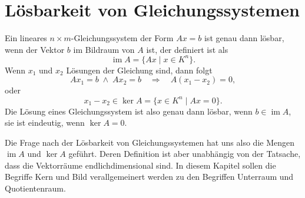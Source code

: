 %
%
%
\section{Lösbarkeit von Gleichungssystemen}
Ein lineares $n\times m$-Gleichungssystem der Form $Ax=b$
ist genau dann lösbar, wenn der Vektor $b$ im Bildraum von $A$ ist,
der definiert ist als
\[
\operatorname{im} A = \{ Ax\;|\; x\in K^n\}.
\]
Wenn $x_1$ und $x_2$ Lösungen der Gleichung sind, dann folgt
\[
Ax_1=b\;\wedge\; Ax_2=b
\quad\Rightarrow\quad
A(x_1-x_2)=0,
\]
oder
\[
x_1-x_2\in\operatorname{ker} A = \{ x\in K^n\;|\; Ax=0\}.
\]
Die Lösung eines Gleichungssystem ist also genau dann lösbar, wenn
$b\in \operatorname{im}A$, sie ist eindeutig, wenn $\operatorname{ker}A=0$.

Die Frage nach der Lösbarkeit von Gleichungssystemen hat uns also die
Mengen $\operatorname{im}A$ und $\operatorname{ker} A$ geführt.
Deren Definition ist aber unabhängig von der Tatsache, dass die
Vektorräume endlichdimensional sind.
In diesem Kapitel sollen die Begriffe Kern und Bild verallgemeinert
werden zu den Begriffen Unterraum und Quotientenraum.



